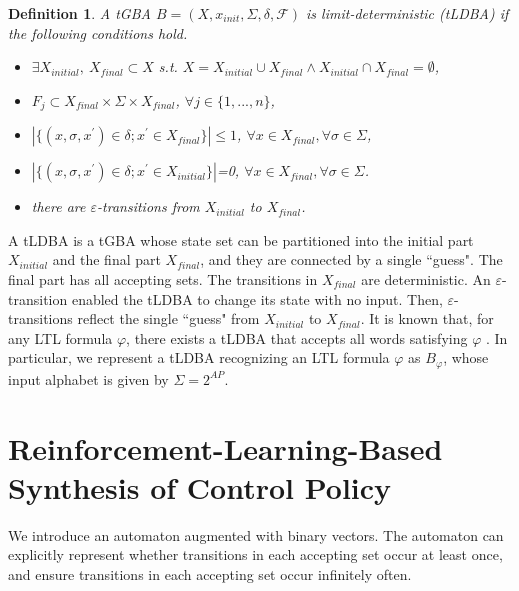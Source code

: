 \documentclass[letterpaper, 10 pt, conference]{ieeeconf}  %
\newtheorem{definition}{Definition}
\begin{document}
\begin{definition}
  A tGBA $B = (X, x_{init},\Sigma,\delta,\mathcal{F})$ is limit-deterministic (tLDBA) if the following conditions hold.
  \begin{itemize}
    \item $\exists X_{initial},\ X_{final} \subset X$ s.t. $X=X_{initial} \cup X_{final} \land X_{initial} \cap X_{final} = \emptyset$,
    \item $F_j \subset X_{final} \times \Sigma \times X_{final}$, $\forall j \in \{ 1,...,n \}$,
    \item $| \{ (x, \sigma, x^{\prime}) \in \delta; x^{\prime} \in X_{final} \} | \! \leq \! 1$, $\forall x \! \in \! X_{final}, \forall \sigma \! \in \! \Sigma$,
    \item $| \{ (x, \sigma, x^{\prime}) \in \delta; x^{\prime} \in X_{initial} \} |$=0, $\forall x \! \in \! X_{final}, \forall \sigma \! \in \! \Sigma$.
    \item there are $\varepsilon$-transitions from $X_{initial}$ to $X_{final}$.
  \end{itemize}
\end{definition}
A tLDBA is a tGBA whose state set can be partitioned into the initial part $X_{initial}$ and the final part $X_{final}$, and they are connected by a single ``guess". The final part has all accepting sets. The transitions in $X_{final}$ are deterministic. An $\varepsilon$-transition enabled the tLDBA to change its state with no input. Then, $\varepsilon$-transitions reflect the single ``guess" from $X_{initial}$ to $X_{final}$.
It is known that, for any LTL formula $ \varphi $, there exists a tLDBA that accepts all words satisfying $\varphi$ \cite{SEJK2016}.
In particular, we represent a tLDBA recognizing an LTL formula $\varphi$ as $B_{\varphi}$, whose input alphabet is given by $ \Sigma = 2^{AP} $.

\section{Reinforcement-Learning-Based Synthesis of Control Policy}
We introduce an automaton augmented with binary vectors. The automaton can explicitly represent whether transitions in each accepting set occur at least once, and ensure transitions in each accepting set occur infinitely often.
\end{document}
